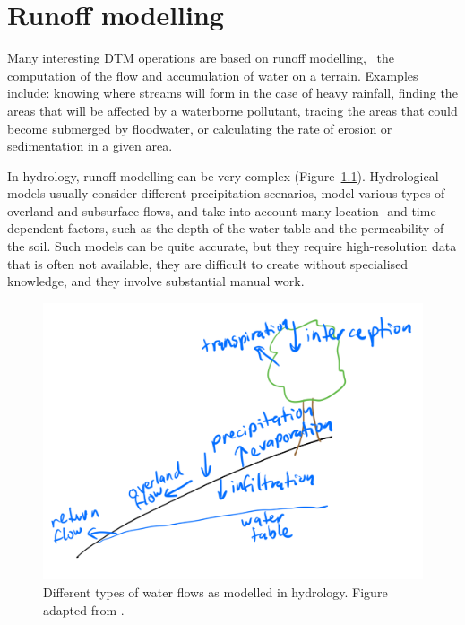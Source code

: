 

\setchapterpreamble[u]{\margintoc}


\graphicspath{{runoff/}}


\chapter{Runoff modelling}%
\label{chap:runoff}

Many interesting DTM operations are based on runoff modelling, \ie\ the computation of the flow and accumulation of water on a terrain.
Examples include: knowing where streams will form in the case of heavy rainfall, finding the areas that will be affected by a waterborne pollutant, tracing the areas that could become submerged by floodwater, or calculating the rate of erosion or sedimentation in a given area.

In hydrology, runoff modelling can be very complex (Figure~\ref{fig:hydrology}).
Hydrological models usually consider different precipitation scenarios, model various types of overland and subsurface flows, and take into account many location- and time-dependent factors, such as the depth of the water table and the permeability of the soil.
Such models can be quite accurate, but they require high-resolution data that is often not available, they are difficult to create without specialised knowledge, and they involve substantial manual work.

\begin{figure}
\centering
\includegraphics[width=0.95\linewidth]{figs/hydrology.pdf}
\caption{Different types of water flows as modelled in hydrology. Figure adapted from \citet{Beven12}.}%
\label{fig:hydrology}
\end{figure}

